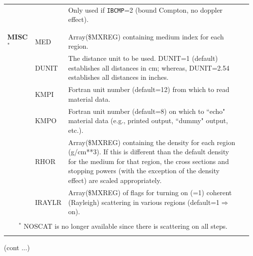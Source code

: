 \begin{table}[htb]
\begin{center}
\begin{tabular}{ l  l   p{105mm}l  |}
       && Only used if {\tt IBCMP}=2 (bound Compton, no doppler effect).\\
&&\\
\hline
&&\\
{\bfseries MISC$^*$}	& MED	&Array(\$MXREG) containing medium index for
                            each region.\\
	& DUNIT	&The distance unit to be used.
                            DUNIT=1 (default) establishes all
                            distances in cm; whereas,
                            DUNIT=2.54 establishes all
                            distances in inches.\\
	&KMPI	&Fortran unit number (default=12)
                            from which to read material data.\\
	&KMPO	&Fortran unit number (default=8) on
                            which to ``echo" material data (e.g.,
                            printed output, ``dummy" output, etc.).\\
	&RHOR	&Array(\$MXREG) containing the density for each region (g/cm**3).
		If this is different than the default density for the medium
		for that region, the cross sections and stopping powers (with
		the exception of the density effect) are scaled appropriately.\\
	&IRAYLR	&Array(\$MXREG) of flags for turning on (=1)
                            coherent (Rayleigh) scattering in
                            various regions (default=1$\Rightarrow$ on).\\
&&\\
\hline
\multicolumn{3}{c}{$^*$ NOSCAT is no longer available since there is
scattering on all steps.}\\
&&\\
\hline
    \end{tabular}
    \end{center}
    \mbox{}\hfill (cont ...)\\
    \end{table}
    \clearpage



